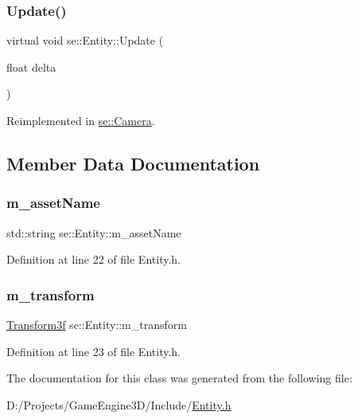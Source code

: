 \mbox{\label{classse_1_1_entity_a1cd277c4c5a517f5cde8b72d5c40a8f0}} 
\subsubsection{\texorpdfstring{Update()}{Update()}}
{\footnotesize\ttfamily virtual void se\+::\+Entity\+::\+Update (\begin{DoxyParamCaption}\item[{float}]{delta }\end{DoxyParamCaption})\hspace{0.3cm}{\ttfamily [virtual]}}



Reimplemented in \mbox{\hyperlink{classse_1_1_camera_abecf2d50dc793707a475b35bb487812c}{se\+::\+Camera}}.



\subsection{Member Data Documentation}
\mbox{\label{classse_1_1_entity_aba1f7cc3700caee65b20c423185ab7ca}} 
\subsubsection{\texorpdfstring{m\+\_\+asset\+Name}{m\_assetName}}
{\footnotesize\ttfamily std\+::string se\+::\+Entity\+::m\+\_\+asset\+Name\hspace{0.3cm}{\ttfamily [protected]}}



Definition at line 22 of file Entity.\+h.

\mbox{\label{classse_1_1_entity_a85a408963ce0920c7bc3bfec29266238}} 
\subsubsection{\texorpdfstring{m\+\_\+transform}{m\_transform}}
{\footnotesize\ttfamily \mbox{\hyperlink{classse_1_1_transform3f}{Transform3f}} se\+::\+Entity\+::m\+\_\+transform\hspace{0.3cm}{\ttfamily [protected]}}



Definition at line 23 of file Entity.\+h.



The documentation for this class was generated from the following file\+:\begin{DoxyCompactItemize}
\item 
D\+:/\+Projects/\+Game\+Engine3\+D/\+Include/\mbox{\hyperlink{_entity_8h}{Entity.\+h}}\end{DoxyCompactItemize}
